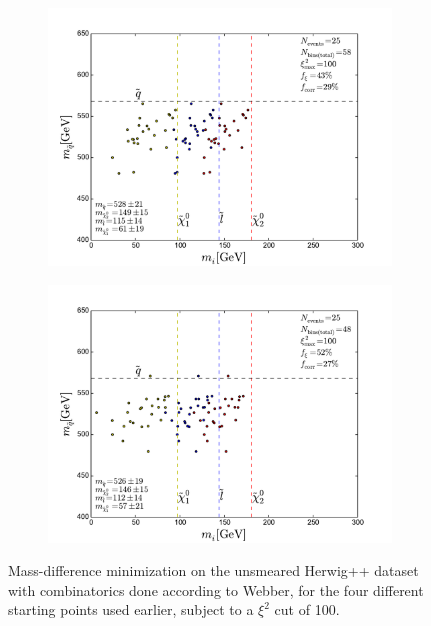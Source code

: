 \documentclass[twoside,english]{uiofysmaster}
\begin{document}
\begin{figure}[hbt]
	\begin{subfigure}[b]{0.45\textwidth}
		\includegraphics[width=\textwidth]{figures/improving_combinatorics/herwigpp-MD-dileptonedge-fit-comb-nosmear-cut100_800-500-300-50.pdf} 
		\caption{ }
	\end{subfigure}
	\begin{subfigure}[b]{0.45\textwidth}
		\includegraphics[width=\textwidth]{figures/improving_combinatorics/herwigpp-MD-dileptonedge-fit-comb-nosmear-cut100_1000-100-80-30.pdf}
		\caption{ } 
	\end{subfigure}
	\caption{Mass-difference minimization on the unsmeared Herwig++ dataset with combinatorics done according to Webber, for the four different starting points used earlier, subject to a $\xi^2$ cut of 100.}
	\label{fig:MD_starting_point_sensitivity_combinatorics_cut}
\end{figure}
\end{document}
